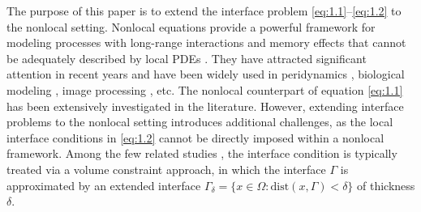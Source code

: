 \documentclass{article}
\theoremstyle{definition}
\begin{document}
The purpose of this paper is to extend the interface problem \eqref{eq:1.1}--\eqref{eq:1.2} to the nonlocal setting.
Nonlocal equations provide a powerful framework for modeling processes with long-range interactions and memory effects that cannot be adequately described by local PDEs \cite{andreu2010nonlocal,du2019nonlocal}.
They have attracted significant attention in recent years and have been widely used in peridynamics \cite{rokkam2019nonlocal}, biological modeling \cite{painter2024biological}, image processing \cite{shi2021image}, etc.
The nonlocal counterpart of equation \eqref{eq:1.1} has been extensively investigated in the literature. However, extending interface problems to the nonlocal setting introduces additional challenges, as the local interface conditions in \eqref{eq:1.2} cannot be directly imposed within a nonlocal framework.
Among the few related studies \cite{alali2015peridynamics,capodaglio2020energy,seleson2013interface}, the interface condition is typically treated via a volume constraint approach, in which the interface $\Gamma$ is approximated by an extended interface $\Gamma_\delta=\{x\in\Omega: \mbox{dist}(x,\Gamma)<\delta\}$ of thickness $\delta$.
\end{document}

